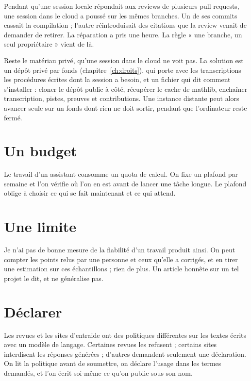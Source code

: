 \begin{exemple}
Pendant qu'une session locale répondait aux reviews de plusieurs pull requests, une session dans le cloud a poussé sur les mêmes branches. Un de ses
commits cassait la compilation ; l'autre réintroduisait des citations que la review
venait de demander de retirer. La réparation a pris une heure. La règle « une branche, un
seul propriétaire » vient de là.
\end{exemple}

Reste le matériau privé, qu'une session dans le cloud ne voit pas. La solution est un dépôt privé par fonds (chapitre~\ref{ch:droits}), qui porte avec les transcriptions les procédures écrites dont la session a besoin, et un fichier  qui dit comment s'installer : cloner le dépôt public à côté, récupérer le cache de mathlib, enchaîner transcription, pistes, preuves et contributions. Une instance distante peut alors avancer seule sur un fonds dont rien ne doit sortir, pendant que l'ordinateur reste fermé.

\section{Un budget}

Le travail d'un assistant consomme un quota de calcul. On fixe un plafond par semaine et
l'on vérifie où l'on en est avant de lancer une tâche longue. Le plafond oblige à choisir
ce qui se fait maintenant et ce qui attend.

\section{Une limite}

Je n'ai pas de bonne mesure de la fiabilité d'un travail produit ainsi. On peut compter les
points relus par une personne et ceux qu'elle a corrigés, et en tirer une estimation sur
ces échantillons ; rien de plus. Un article honnête sur un tel projet le dit, et ne
généralise pas.

\section{Déclarer}

Les revues et les sites d'entraide ont des politiques différentes sur les textes écrits avec
un modèle de langage. Certaines revues les refusent ; certains sites interdisent les
réponses générées ; d'autres demandent seulement une déclaration. On lit la politique avant
de soumettre, on déclare l'usage dans les termes demandés, et l'on écrit soi-même ce qu'on
publie sous son nom.

